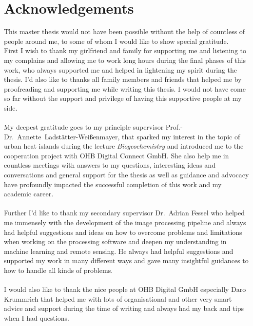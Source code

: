 \section*{Acknowledgements}
This master thesis would not have been possible without the help of countless of people around me, to some of whom I would like to show special gratitude. \\
%
First I wish to thank my girlfriend and family for supporting me and listening to my complains and allowing me to work long hours during the final phases of this work, who always supported me and helped in lightening my spirit during the thesis. 
I'd also like to thanks all family members and friends that helped me by proofreading and supporting me while writing this thesis.
I would not have come so far without the support and privilege of having this supportive people at my side.\\ \\
%
My deepest gratitude goes to my principle supervisor Prof.-Dr.~Annette~Ladstätter-Weißenmayer, that sparked my interest in the topic of urban heat islands during the lecture \textit{Biogeochemistry} and introduced me to the cooperation project with OHB Digital Connect GmbH. 
She also help me in countless meetings with answers to my questions, interesting ideas and conversations and general support for the thesis as well as guidance and advocacy have profoundly impacted the successful completion of this work and my academic career. \\ \\
%
Further I'd like to thank my secondary supervisor Dr.\ Adrian Fessel who helped me immensely with the development of the image processing pipeline and always had helpful suggestions and ideas on how to overcome problems and limitations when working on the processing software and deepen my understanding in machine learning and remote sensing. 
He always had helpful suggestions and supported my work in many different ways and gave many insightful guidances to how to handle all kinds of problems.\\ \\
%
I would also like to thank the nice people at OHB Digital GmbH especially Daro Krummrich that helped me with lots of organisational and other very smart advice and support during the time of writing and always had my back and tips when I had questions.
%
%
%
\newpage
